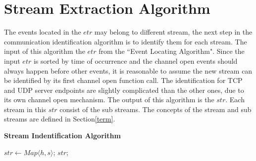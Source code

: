 \section{Stream Extraction Algorithm}
The events located in the $etr$ may belong to different stream, the next step in the communication identification algorithm is to identify them for each stream. The input of this algorithm the $etr$ from the ``Event Locating Algorithm". Since the input  $etr$ is sorted by time of occurrence and the channel open events should always happen before other events, it is reasonable to assume the new stream can be identified by its first channel open function call. The identification for TCP and UDP server endpoints are slightly complicated than the other ones, due to its own channel open mechanism. The output of this algorithm is the $str$. Each stream in this $str$ consist of the sub streams. The concepts of the stream and sub streams are defined in Section\ref{term}. 

\begin{algorithm}[H]
\DontPrintSemicolon
\caption{{\bf Stream Indentification Algorithm} \label{endpointIdentAlg}}
$str \leftarrow Map \langle h, s\rangle$;\; 
\KwRet $str$;\;
\end{algorithm} 

